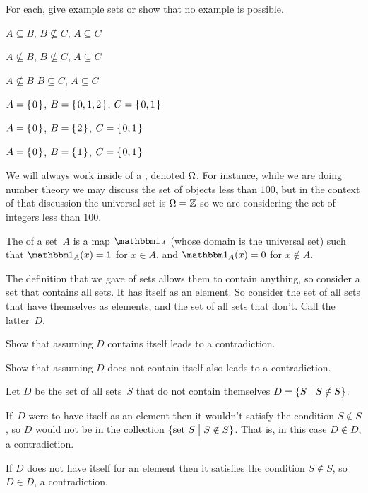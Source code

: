 \documentclass{ibl}
\begin{document}
\begin{ex} For each, give example sets or show that no example is possible.
\begin{exes}
\item $A\subseteq B$, $B\not\subseteq C$, $A\subseteq C$
\item $A\not\subseteq B$, $B\not\subseteq C$, $A\subseteq C$
\item $A\not\subseteq B$ $B\subseteq C$, $A\subseteq C$    
\end{exes}
\begin{ans}
\begin{exes}
\item $A=\mbox{$\{\hspace{0.1em}0\hspace{0.1em}\}$}$, $B=\mbox{$\{\hspace{0.1em}0,1,2\hspace{0.1em}\}$}$, $C=\mbox{$\{\hspace{0.1em}0,1\hspace{0.1em}\}$}$
\item $A=\mbox{$\{\hspace{0.1em}0\hspace{0.1em}\}$}$, $B=\mbox{$\{\hspace{0.1em}2\hspace{0.1em}\}$}$, $C=\mbox{$\{\hspace{0.1em}0,1\hspace{0.1em}\}$}$
\item $A=\mbox{$\{\hspace{0.1em}0\hspace{0.1em}\}$}$, $B=\mbox{$\{\hspace{0.1em}1\hspace{0.1em}\}$}$, $C=\mbox{$\{\hspace{0.1em}0,1\hspace{0.1em}\}$}$
\end{exes}
\end{ans}
\end{ex}

We will always work inside of a , 
denoted $\Omega$.
For instance, while we are doing number theory we may discuss 
the set of objects less than $100$,
but in the context of that discussion the universal set is $\Omega=\mathbb{Z}$ 
so we are considering the set of integers less than $100$.

\begin{df}
The  of a set~$A$ is a map
$\charfcn{A}$ (whose domain is the universal set) such that
$\charfcn{A}(x)=1$ for $x\in A$, and $\charfcn{A}(x)=0$ for $x\notin A$.  
\end{df}

\begin{ex} 
The definition that we gave of sets allows them to contain anything, so 
consider a set that contains all sets.
It has itself as an element.
So consider the set of all sets that have themselves as elements, and  
the set of all sets that don't.
Call the latter~$D$.
\begin{exes}
\item Show that assuming $D$ contains itself leads to a contradiction.
\item Show that assuming $D$ does not contain itself also leads to a
contradiction.  
\end{exes}
\begin{ans}
Let $D$ be the set of all sets~$S$ that do not contain themselves
$D=\{S \bigm| S\notin S\}$.
\begin{exes}
\item If~$D$ were to have itself as an element 
  then it wouldn't satisfy the condition
  $S\notin S$, so $D$ would not be in the collection 
  $\{\text{set~$S$} \bigm| S\notin S\}$.
  That is, in this case $D\notin D$, a contradiction. 
\item If $D$ does not have itself for an element then it satisfies the
  condition $S\notin S$, so $D\in D$, a contradiction.
\end{exes}
\end{ans}
\end{ex}
\end{document}

